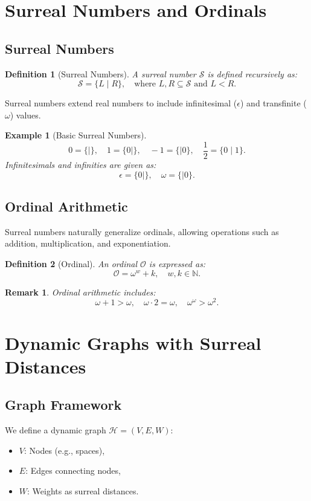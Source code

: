 \documentclass[12pt]{article}
\newcommand{\ord}[0]{\mathcal{O}}
\newcommand{\sur}[0]{\mathcal{S}}
\newcommand{\house}[0]{\mathcal{H}}
\newtheorem{definition}{Definition}[section]
\newtheorem{example}{Example}[section]
\newtheorem{remark}{Remark}[section]
\begin{document}
\section{Surreal Numbers and Ordinals}

\subsection{Surreal Numbers}
\begin{definition}[Surreal Numbers]
A surreal number $\sur$ is defined recursively as:
\[
\sur = \{ L \mid R \}, \quad \text{where } L, R \subseteq \sur \text{ and } L < R.
\]
\end{definition}

Surreal numbers extend real numbers to include infinitesimal ($\epsilon$) and transfinite ($\omega$) values.

\begin{example}[Basic Surreal Numbers]
\[
0 = \{ \mid \}, \quad 1 = \{ 0 \mid \}, \quad -1 = \{ \mid 0 \}, \quad \frac{1}{2} = \{ 0 \mid 1 \}.
\]
Infinitesimals and infinities are given as:
\[
\epsilon = \{ 0 \mid \}, \quad \omega = \{ \mid 0 \}.
\]
\end{example}

\subsection{Ordinal Arithmetic}
Surreal numbers naturally generalize ordinals, allowing operations such as addition, multiplication, and exponentiation.

\begin{definition}[Ordinal]
An ordinal $\ord$ is expressed as:
\[
\ord = \omega^w + k, \quad w, k \in \mathbb{N}.
\]
\end{definition}

\begin{remark}
Ordinal arithmetic includes:
\[
\omega + 1 > \omega, \quad \omega \cdot 2 = \omega, \quad \omega^\omega > \omega^2.
\]
\end{remark}

\section{Dynamic Graphs with Surreal Distances}

\subsection{Graph Framework}
We define a dynamic graph $\house = (V, E, W)$:
\begin{itemize}
    \item $V$: Nodes (e.g., spaces),
    \item $E$: Edges connecting nodes,
    \item $W$: Weights as surreal distances.
\end{itemize}
\end{document}
